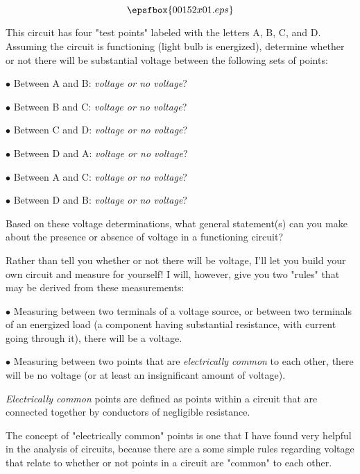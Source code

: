 

$$\epsfbox{00152x01.eps}$$

This circuit has four "test points" labeled with the letters A, B, C, and D.  Assuming the circuit is functioning (light bulb is energized), determine whether or not there will be substantial voltage between the following sets of points:

\medskip
\item{$\bullet$} Between A and B: {\it voltage or no voltage}?
\item{$\bullet$} Between B and C: {\it voltage or no voltage}?
\item{$\bullet$} Between C and D: {\it voltage or no voltage}?
\item{$\bullet$} Between D and A: {\it voltage or no voltage}?
\item{$\bullet$} Between A and C: {\it voltage or no voltage}?
\item{$\bullet$} Between D and B: {\it voltage or no voltage}?
\medskip

Based on these voltage determinations, what general statement(s) can you make about the presence or absence of voltage in a functioning circuit?







Rather than tell you whether or not there will be voltage, I'll let you build your own circuit and measure for yourself!  I will, however, give you two "rules" that may be derived from these measurements:

\medskip
\item{$\bullet$} Measuring between two terminals of a voltage source, or between two terminals of an energized load (a component having substantial resistance, with current going through it), there will be a voltage.
\item{$\bullet$} Measuring between two points that are {\it electrically common} to each other, there will be no voltage (or at least an insignificant amount of voltage).
\medskip







{\it Electrically common} points are defined as points within a circuit that are connected together by conductors of negligible resistance.

The concept of "electrically common" points is one that I have found very helpful in the analysis of circuits, because there are a some simple rules regarding voltage that relate to whether or not points in a circuit are "common" to each other.




